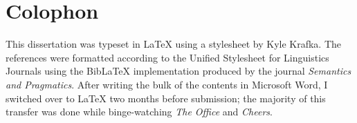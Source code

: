 


\chapter{Colophon}

This dissertation was typeset in {\LaTeX} using a stylesheet by Kyle Krafka. The references were formatted according to the Unified Stylesheet for Linguistics Journals using the BibLaTeX implementation produced by the journal \textit{Semantics and Pragmatics}. After writing the bulk of the contents in Microsoft Word, I switched over to {\LaTeX} two months before submission; the majority of this transfer was done while binge-watching \textit{The Office} and \textit{Cheers}.

